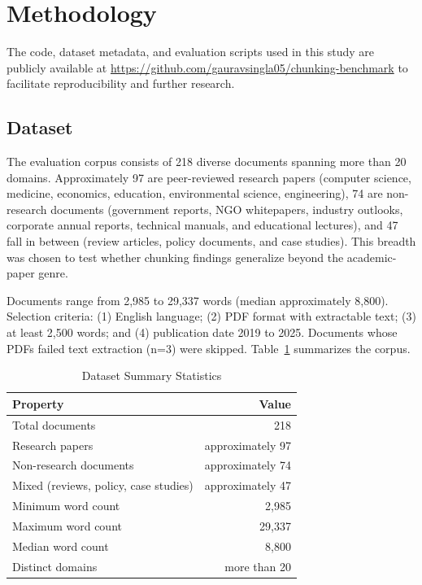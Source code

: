 \documentclass{ieeeaccess}
\begin{document}
\section{Methodology}
\label{sec:methodology}

The code, dataset metadata, and evaluation scripts used in this study are publicly available at \url{https://github.com/gauravsingla05/chunking-benchmark} to facilitate reproducibility and further research.

\subsection{Dataset}

The evaluation corpus consists of 218 diverse documents spanning more than 20 domains. Approximately 97 are peer-reviewed research papers (computer science, medicine, economics, education, environmental science, engineering), 74 are non-research documents (government reports, NGO whitepapers, industry outlooks, corporate annual reports, technical manuals, and educational lectures), and 47 fall in between (review articles, policy documents, and case studies). This breadth was chosen to test whether chunking findings generalize beyond the academic-paper genre.

Documents range from 2,985 to 29,337 words (median approximately 8,800). Selection criteria: (1) English language; (2) PDF format with extractable text; (3) at least 2,500 words; and (4) publication date 2019 to 2025. Documents whose PDFs failed text extraction (n=3) were skipped. Table~\ref{tab:dataset} summarizes the corpus.

\begin{table}[h]
\caption{Dataset Summary Statistics}
\label{tab:dataset}
\centering
\begin{tabular}{|l|r|}
\hline
\textbf{Property} & \textbf{Value} \\
\hline
Total documents & 218 \\
Research papers & approximately 97 \\
Non-research documents & approximately 74 \\
Mixed (reviews, policy, case studies) & approximately 47 \\
Minimum word count & 2,985 \\
Maximum word count & 29,337 \\
Median word count & 8,800 \\
Distinct domains & more than 20 \\
\hline
\end{tabular}
\end{table}
\end{document}
